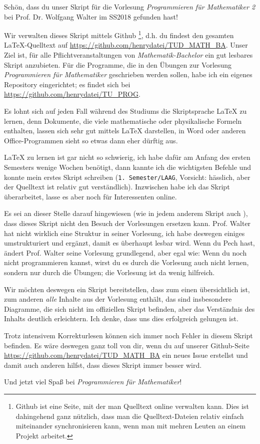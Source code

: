 Schön, dass du unser Skript für die Vorlesung \textit{Programmieren für Mathematiker 2} bei Prof. Dr. Wolfgang Walter im SS2018 gefunden hast!

Wir verwalten dieses Skript mittels Github \footnote{Github ist eine Seite, mit der man Quelltext online verwalten kann. Dies ist dahingehend ganz nützlich, dass man die Quelltext-Dateien relativ einfach miteinander synchronisieren kann, wenn man mit mehren Leuten an einem Projekt arbeitet.}, d.h. du findest den gesamten \LaTeX-Quelltext auf \url{https://github.com/henrydatei/TUD_MATH_BA}. Unser Ziel ist, für alle Pflichtveranstaltungen von \textit{Mathematik-Bachelor} ein gut lesbares Skript anzubieten. Für die Programme, die in den Übungen zur Vorlesung \textit{Programmieren für Mathematiker} geschrieben werden sollen, habe ich ein eigenes Repository eingerichtet; es findet sich bei \url{https://github.com/henrydatei/TU_PROG}.

Es lohnt sich auf jeden Fall während des Studiums die Skriptsprache \LaTeX{} zu lernen, denn Dokumente, die viele mathematische oder physikalische Formeln enthalten, lassen sich sehr gut mittels \LaTeX{} darstellen, in Word oder anderen Office-Programmen sieht so etwas dann eher dürftig aus.

\LaTeX{} zu lernen ist gar nicht so schwierig, ich habe dafür am Anfang des ersten Semesters wenige Wochen benötigt, dann kannte ich die wichtigsten Befehle und konnte mein erstes Skript schreiben (\texttt{1. Semester/LAAG}, Vorsicht: hässlich, aber der Quelltext ist relativ gut verständlich). Inzwischen habe ich das Skript überarbeitet, lasse es aber noch für Interessenten online.

Es sei an dieser Stelle darauf hingewiesen (wie in jedem anderem Skript auch \smiley{}), dass dieses Skript nicht den Besuch der Vorlesungen ersetzen kann. Prof. Walter hat nicht wirklich eine Struktur in seiner Vorlesung, ich habe deswegen einiges umstrukturiert und ergänzt, damit es überhaupt lesbar wird. Wenn du Pech hast, ändert Prof. Walter seine Vorlesung grundlegend, aber egal wie: Wenn du noch nicht programmieren kannst, wirst du es durch die Vorlesung auch nicht lernen, sondern nur durch die Übungen; die Vorlesung ist da wenig hilfreich.

Wir möchten deswegen ein Skript bereitstellen, dass zum einen übersichtlich ist, zum anderen \textit{alle} Inhalte aus der Vorlesung enthält, das sind insbesondere Diagramme, die sich nicht im offiziellen Skript befinden, aber das Verständnis des Inhalts deutlich erleichtern. Ich denke, dass uns dies erfolgreich gelungen ist.

Trotz intensivem Korrekturlesen können sich immer noch Fehler in diesem Skript befinden. Es wäre deswegen ganz toll von dir, wenn du auf unserer Github-Seite \url{https://github.com/henrydatei/TUD_MATH_BA} ein neues Issue erstellst und damit auch anderen hilfst, dass dieses Skript immer besser wird.

Und jetzt viel Spaß bei \textit{Programmieren für Mathematiker}!
